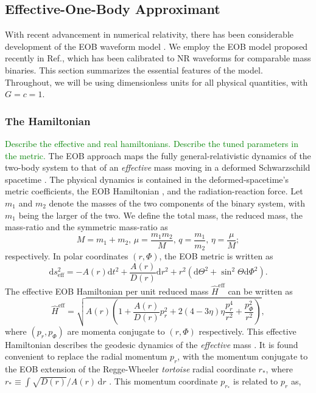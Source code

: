 \documentclass[aps,
prd,
amsmath,
amssymb,
twocolumn,
floatfix,
groupedaddress]{revtex4-1}
\newcommand{\D}{\mathrm{d}}
\newcommand{\eff}{\mathrm{eff}}
\begin{document}
\subsection{Effective-One-Body Approximant}\label{sec:level2:EOBNRv2}
With recent advancement in numerical relativity, there has been considerable development of the EOB waveform model \cite{EOBdevel01,EOBdevel02,EOBNRdevel03,DamourFluxhlm01,EOBNRdevel01}. We employ the EOB model proposed recently in Ref.\citep{BuonannoEOBv2Main}, which has been calibrated to NR waveforms for comparable mass binaries. This section summarizes the essential features of the model. Throughout, we will be using dimensionless units for all physical quantities, with $G=c=1$.

\subsubsection{The Hamiltonian}\label{sec:level3:EOBNRv2:Hamiltonian}
\textcolor{green}{Describe the effective and real hamiltonians. Describe the tuned parameters in the metric.}
The EOB approach maps the fully general-relativistic dynamics of the two-body system to that of an \textit{effective} mass moving in a deformed Schwarzschild spacetime \citep{EOBOriginalBuonannoDamour}. The physical dynamics is contained in the deformed-spacetime's metric coefficients, the EOB Hamiltonian \cite{EOBOriginalBuonannoDamour}, and the radiation-reaction force. Let $m_1$ and $m_2$ denote the masses of the two components of the binary system, with $m_1$ being the larger of the two. We define the total mass, the reduced mass, the mass-ratio and the symmetric mass-ratio as
\begin{equation}
M = m_1 + m_2, \,\mu =\dfrac{m_1m_2}{M},\, q=\dfrac{m_1}{m_2},\,\eta = \dfrac{\mu}{M};
\end{equation}
respectively. In polar coordinates $(r,\Phi)$, the EOB metric is written as
\begin{equation}
\D s_{\eff}^2 = -A(r)\D t^2 + \dfrac{A(r)}{D(r)}\D r^2 + r^2\left(\D\Theta^2 + \sin^2\Theta \D\Phi^2\right).
\end{equation}
The effective EOB Hamiltonian per unit reduced mass $\hat{H}^{\eff}$ can be written as \citep{EOBOriginalBuonannoDamour}
\begin{equation}
\hat{H}^{\eff} = \sqrt{A(r) \left( 1 +  \dfrac{A(r)}{D(r)}p_r^2 + 2(4 - 3\eta)\eta \dfrac{p_r^4}{r^2} + \dfrac{p^2_{\Phi}}{r^2} \right)},
\end{equation}
where $(p_r,p_{\Phi})$ are momenta conjugate to $(r,\Phi)$ respectively. This effective Hamiltonian describes the geodesic dynamics of the \textit{effective} mass \citep{EOBEffHamiltonian}. It is found convenient to replace the radial momentum $p_r$, with the momentum conjugate to the EOB extension of the Regge-Wheeler \textit{tortoise} radial coordinate $r_*$, where $r_*\equiv\int\sqrt{D(r)}/A(r)\,\D r$ \citep{DamourNQC01} . This momentum coordinate $p_{r_*}$ is related to $p_r$ as,
\end{document}
